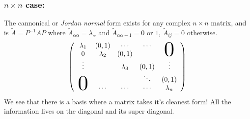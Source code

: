 \documentclass{article}
\numberwithin{equation}{section}
\begin{document}
\subsubsection*{$n \times n$ case:}
The cannonical or \emph{Jordan normal} form exists for any complex $n \times n$ matrix, and is $\tilde{A} = P^{-1}AP$
where $\tilde{A}_{\alpha \alpha} = \lambda_\alpha$ and $\tilde{A}_{\alpha \alpha + 1} = 0 \text{ or } 1$, $\tilde{A}_{ij} = 0$ otherwise.
\[
    \bkt{\begin{array}{ccccc}
        \lambda_1              & (0,1)     & \cdots    & \cdots    &  \\
        0                      & \lambda_2 & (0,1)     &           &\smash{\scalebox{3}{0}} \\
        \vdots                 &           & \lambda_3 & (0,1)     & \vdots \\
                               &           &           & \ddots    & (0,1)  \\
        \smash{\scalebox{3}{0}}& \cdots    & \cdots    & \cdots    & \lambda_n
    \end{array}}    
\]
We see that there is a basis where a matrix takes it's cleanest form! All the information lives on the diagonal and its super diagonal.
\end{document}
